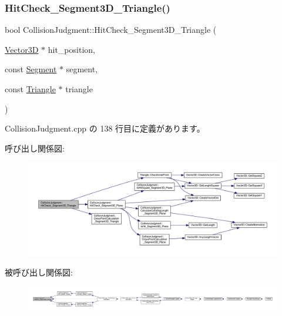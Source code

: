\subsubsection{\texorpdfstring{Hit\+Check\+\_\+\+Segment3\+D\+\_\+\+Triangle()}{HitCheck\_Segment3D\_Triangle()}}
{\footnotesize\ttfamily bool Collision\+Judgment\+::\+Hit\+Check\+\_\+\+Segment3\+D\+\_\+\+Triangle (\begin{DoxyParamCaption}\item[{\mbox{\hyperlink{class_vector3_d}{Vector3D}} $\ast$}]{hit\+\_\+position,  }\item[{const \mbox{\hyperlink{class_segment}{Segment}} $\ast$}]{segment,  }\item[{const \mbox{\hyperlink{class_triangle}{Triangle}} $\ast$}]{triangle }\end{DoxyParamCaption})\hspace{0.3cm}{\ttfamily [static]}}



 Collision\+Judgment.\+cpp の 138 行目に定義があります。

呼び出し関係図\+:\nopagebreak
\begin{figure}[H]
\begin{center}
\leavevmode
\includegraphics[width=350pt]{class_collision_judgment_a4f5344d6ac14db5d3732db47050bd549_cgraph}
\end{center}
\end{figure}
被呼び出し関係図\+:
\nopagebreak
\begin{figure}[H]
\begin{center}
\leavevmode
\includegraphics[width=350pt]{class_collision_judgment_a4f5344d6ac14db5d3732db47050bd549_icgraph}
\end{center}
\end{figure}
\mbox{\label{class_collision_judgment_a4cc335999fcbeadf0aa1b6ebcb749e5b}} 
